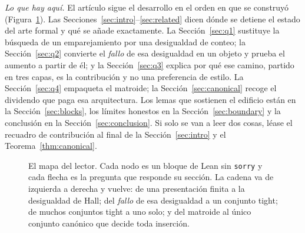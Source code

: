 \documentclass[11pt]{article}
\newcommand{\lean}[1]{\texttt{#1}}
\newcommand{\N}{\mathrm{N}}
\begin{document}
\medskip
\noindent\emph{Lo que hay aquí.} El artículo sigue el desarrollo en el orden en que se construyó
(Figura~\ref{fig:readermap}). Las Secciones~\ref{sec:intro}--\ref{sec:related} dicen dónde se
detiene el estado del arte formal y qué se añade exactamente. La Sección~\ref{sec:q1} sustituye la
búsqueda de un emparejamiento por una desigualdad de conteo; la Sección~\ref{sec:q2} convierte el
\emph{fallo} de esa desigualdad en un objeto y prueba el aumento a partir de él; y la
Sección~\ref{sec:q3} explica por qué ese camino, partido en tres capas, es la contribución y no una
preferencia de estilo. La Sección~\ref{sec:q4} empaqueta el matroide; la
Sección~\ref{sec:canonical} recoge el dividendo que paga esa arquitectura. Los lemas que sostienen
el edificio están en la Sección~\ref{sec:blocks}, los límites honestos en la
Sección~\ref{sec:boundary} y la conclusión en la Sección~\ref{sec:conclusion}. Si solo se van a
leer dos cosas, léase el recuadro de contribución al final de la Sección~\ref{sec:intro} y el
Teorema~\ref{thm:canonical}.

\begin{figure}[htbp]
\centering
{}
\caption{El mapa del lector. Cada nodo es un bloque de Lean sin \lean{sorry} y cada flecha es la
pregunta que responde su sección. La cadena va de izquierda a derecha y vuelve: de una presentación
finita a la desigualdad de Hall; del \emph{fallo} de esa desigualdad a un conjunto tight; de muchos
conjuntos tight a uno solo; y del matroide al único conjunto canónico que decide toda inserción.}
\label{fig:readermap}
\end{figure}
\end{document}
